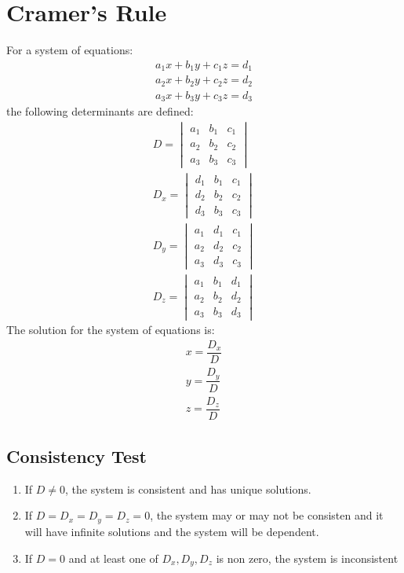 \documentclass[../main.tex]{subfiles}
\begin{document}
	\section{Cramer's Rule}
	For a system of equations:
	\begin{align}
		a_1x+b_1y+c_1z=d_1\nonumber\\
		a_2x+b_2y+c_2z=d_2\nonumber\\
		a_3x+b_3y+c_3z=d_3\nonumber
	\end{align}
	the following determinants are defined:
	\begin{align}
		D=\begin{vmatrix}a_1&b_1&c_1\\a_2&b_2&c_2\\a_3&b_3&c_3\end{vmatrix}\nonumber\\
		D_x=\begin{vmatrix}d_1&b_1&c_1\\d_2&b_2&c_2\\d_3&b_3&c_3\end{vmatrix}\nonumber\\
		D_y=\begin{vmatrix}a_1&d_1&c_1\\a_2&d_2&c_2\\a_3&d_3&c_3\end{vmatrix}\nonumber\\
		D_z=\begin{vmatrix}a_1&b_1&d_1\\a_2&b_2&d_2\\a_3&b_3&d_3\end{vmatrix}\nonumber
	\end{align}
	The solution for the system of equations is:
	\begin{align}
		x=\dfrac{D_x}{D}\\
		y=\dfrac{D_y}{D}\\
		z=\dfrac{D_z}{D}
	\end{align}

	\subsection{Consistency Test}
	\begin{enumerate}
		\item If $D\neq0$, the system is consistent and has unique solutions.
		
		\item If $D=D_x=D_y=D_z=0$, the system may or may not be consisten and it will have infinite solutions and the system will be dependent.
		
		\item If $D=0$ and at least one of $D_x, D_y, D_z$ is non zero, the system is inconsistent
	\end{enumerate}
\end{document}
